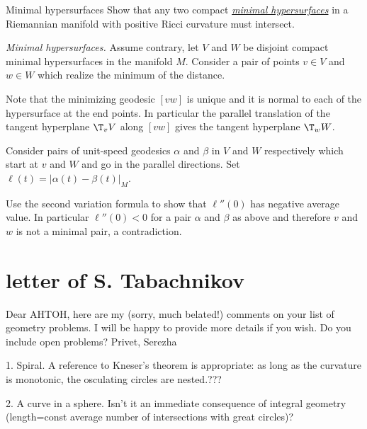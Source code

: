 \begin{pr}{}{Minimal hypersurfaces}\label{Minimal hypersurfaces}
Show that any two compact \hyperref[Minimal surface]{\emph{minimal hypersurfaces}} in a Riemannian manifold with positive Ricci curvature must intersect.
\end{pr}

\textit{Minimal hypersurfaces.}
Assume contrary, let $V$ and $W$ be disjoint compact minimal hypersurfaces in the manifold $M$.
Consider a pair of points $v\in V$ and $w\in W$ which realize the minimum of the distance.

Note that the minimizing geodesic $[vw]$ is unique and it is normal to each of the hypersurface at the end points.
In particular the parallel translation of the tangent hyperplane $\T_vV$ along $[vw]$ gives the tangent hyperplane $\T_wW$.

Consider pairs of unit-speed geodesics $\alpha$ and $\beta$ 
in $V$ and $W$ respectively 
which start at $v$ and $W$ and go in the parallel directions. 
Set $\ell(t)=|\alpha(t)-\beta(t)|_M$.

Use the second variation formula to show that $\ell''(0)$ has negative average value. 
In particular $\ell''(0)<0$ for a pair $\alpha$ and $\beta$ as above
and therefore  $v$ and $w$ is not a minimal pair, a contradiction.



















\chapter{letter of S. Tabachnikov}

Dear AHTOH, here are my (sorry, much belated!) comments on your list
of geometry problems. I will be happy to provide more details if you
wish. Do you include open problems? Privet, Serezha

1. Spiral. A reference to Kneser's theorem is appropriate: as long as
the curvature is monotonic, the osculating circles are nested.???

2. A curve in a sphere. Isn't it an immediate consequence of integral
geometry (length=const \times average number of intersections with
great circles)?

